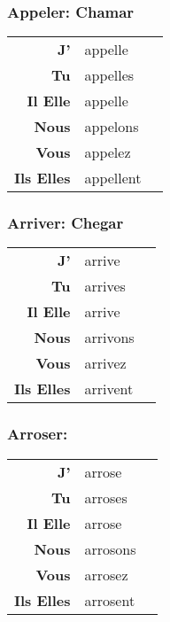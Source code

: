 \documentclass{subfiles}
\begin{document}
\begin{multicols*}{3}
        \subsubsection{Appeler: Chamar}
            \begin{tabular}{r l r}
                \textbf{J'}        & appelle  &\\
                \textbf{Tu}        & appelles &\\
                \textbf{Il Elle}   & appelle  &\\
                \textbf{Nous}      & appelons &\\
                \textbf{Vous}      & appelez  &\\
                \textbf{Ils Elles} & appellent &
            \end{tabular}
    
        \subsubsection{Arriver: Chegar}
            \begin{tabular}{r l r}
                \textbf{J'}        & arrive   &\\
                \textbf{Tu}        & arrives  &\\
                \textbf{Il Elle}   & arrive   &\\
                \textbf{Nous}      & arrivons &\\
                \textbf{Vous}      & arrivez  &\\
                \textbf{Ils Elles} & arrivent &
            \end{tabular}

        \subsubsection{Arroser: }
            \begin{tabular}{r l r}
                \textbf{J'}        & arrose   &\\
                \textbf{Tu}        & arroses  &\\
                \textbf{Il Elle}   & arrose   &\\
                \textbf{Nous}      & arrosons &\\
                \textbf{Vous}      & arrosez  &\\
                \textbf{Ils Elles} & arrosent &
            \end{tabular}


\end{multicols*}
\end{document}
